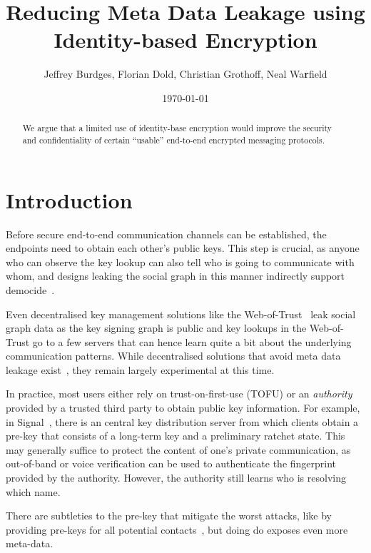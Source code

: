 \documentclass[twoside,letterpaper]{sig-alternate}
\title{Reducing Meta Data Leakage using Identity-based Encryption} %
\author{Jeffrey Burdges, Florian Dold, Christian Grothoff, Neal Wa{\bf r}field}
\date{\today}
\begin{document}
\maketitle


\begin{abstract}
We argue that a limited use of identity-base encryption would improve
the security and confidentiality of certain ``usable'' end-to-end
encrypted messaging protocols.
\end{abstract}

\section{Introduction}

Before secure end-to-end communication channels can be established,
the endpoints need to obtain each other's public keys.  This step is
crucial, as anyone who can observe the key lookup can also tell who is
going to communicate with whom, and designs leaking the social graph
in this manner indirectly support democide~\cite{skynet}.

Even decentralised key management solutions like the
Web-of-Trust~\cite{wot} leak social graph data as the key signing
graph is public and key lookups in the Web-of-Trust go to a few
servers that can hence learn quite a bit about the underlying
communication patterns.  While decentralised solutions that avoid meta
data leakage exist~\cite{gns}, they remain largely experimental at
this time.

In practice, most users either rely on trust-on-first-use (TOFU) or an
{\em authority} provided by a trusted third party to obtain public key
information.  For example, in Signal~\cite{TextSecure}, there is an
central key distribution server from which clients obtain a pre-key
that consists of a long-term key and a preliminary ratchet state.
This may generally suffice to protect the content of one's private
communication, as out-of-band or voice verification can be used to
authenticate the fingerprint provided by the authority.
However, the authority still learns who is resolving which
name.

There are subtleties to the pre-key that mitigate the worst attacks,
like by providing pre-keys for all potential
contacts~\cite[\S4.3]{TextSecure}, but doing do exposes even more
meta-data.
\end{document}
